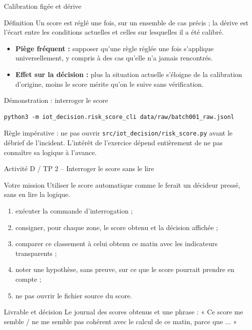 \documentclass[aspectratio=169]{beamer}
\begin{document}
\begin{frame}{Calibration figée et dérive}
  \begin{block}{Définition}
    Un score est réglé une fois, sur un ensemble de cas précis ; la dérive est l'écart entre les conditions actuelles et celles sur lesquelles il a été calibré.
  \end{block}
  \begin{itemize}
    \item \textbf{Piège fréquent :} supposer qu'une règle réglée une fois s'applique universellement, y compris à des cas qu'elle n'a jamais rencontrés.
    \item \textbf{Effet sur la décision :} plus la situation actuelle s'éloigne de la calibration d'origine, moins le score mérite qu'on le suive sans vérification.
  \end{itemize}
\end{frame}

\begin{frame}[fragile]{Démonstration : interroger le score}
  \scriptsize
  \begin{verbatim}
python3 -m iot_decision.risk_score_cli data/raw/batch001_raw.jsonl
  \end{verbatim}
  \normalsize
  \alert{Règle impérative : ne pas ouvrir \texttt{src/iot\_decision/risk\_score.py} avant le débrief de l'incident. L'intérêt de l'exercice dépend entièrement de ne pas connaître sa logique à l'avance.}
\end{frame}

\begin{frame}{Activité D / TP 2 -- Interroger le score sans le lire}
  \begin{block}{Votre mission}
    Utiliser le score automatique comme le ferait un décideur pressé, sans en lire la logique.
  \end{block}
  \begin{enumerate}
    \item exécuter la commande d'interrogation ;
    \item consigner, pour chaque zone, le score obtenu et la décision affichée ;
    \item comparer ce classement à celui obtenu ce matin avec les indicateurs transparents ;
    \item noter une hypothèse, sans preuve, sur ce que le score pourrait prendre en compte ;
    \item ne pas ouvrir le fichier source du score.
  \end{enumerate}
  \begin{block}{Livrable et décision}
    Le journal des scores obtenus et une phrase : « Ce score me semble / ne me semble pas cohérent avec le calcul de ce matin, parce que ... »
  \end{block}
\end{frame}
\end{document}
